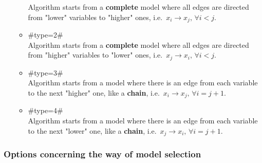 \begin{itemize}
\begin{itemize}
    Algorithm starts from a {\bf complete} model where all edges are directed
    from "lower" variables to "higher" ones, i.e.~$x_i \rightarrow x_j, \, \forall i<j$.
\item #type=2# \\
    Algorithm starts from a {\bf complete} model where all edges are directed
    from "higher" variables to "lower" ones, i.e.~$x_j \rightarrow x_i, \, \forall i<j$.
\item #type=3# \\
    Algorithm starts from a model where there is an edge from each variable to
    the next "higher" one, like a {\bf chain}, i.e.~$x_i \rightarrow x_j, \, \forall i=j+1$.
\item #type=4# \\
    Algorithm starts from a model where there is an edge from each variable to
    the next "lower" one, like a {\bf chain}, i.e.~$x_j \rightarrow x_i, \, \forall i=j+1$.
\end{itemize}
\end{itemize}

\subsubsection*{Options concerning the way of model selection}

